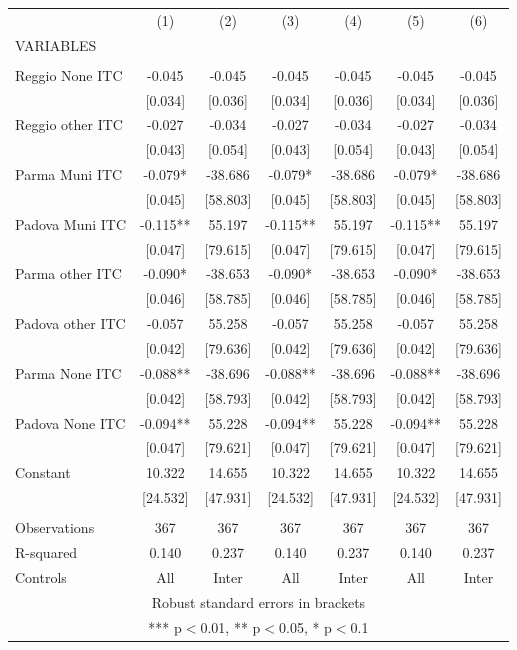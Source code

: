 \begin{tabular}{lcccccc} \hline
 & (1) & (2) & (3) & (4) & (5) & (6) \\
VARIABLES &  &  &  &  &  &  \\ \hline
 &  &  &  &  &  &  \\
Reggio None ITC & -0.045 & -0.045 & -0.045 & -0.045 & -0.045 & -0.045 \\
 & [0.034] & [0.036] & [0.034] & [0.036] & [0.034] & [0.036] \\
Reggio other ITC & -0.027 & -0.034 & -0.027 & -0.034 & -0.027 & -0.034 \\
 & [0.043] & [0.054] & [0.043] & [0.054] & [0.043] & [0.054] \\
Parma Muni ITC & -0.079* & -38.686 & -0.079* & -38.686 & -0.079* & -38.686 \\
 & [0.045] & [58.803] & [0.045] & [58.803] & [0.045] & [58.803] \\
Padova Muni ITC & -0.115** & 55.197 & -0.115** & 55.197 & -0.115** & 55.197 \\
 & [0.047] & [79.615] & [0.047] & [79.615] & [0.047] & [79.615] \\
Parma other ITC & -0.090* & -38.653 & -0.090* & -38.653 & -0.090* & -38.653 \\
 & [0.046] & [58.785] & [0.046] & [58.785] & [0.046] & [58.785] \\
Padova other ITC & -0.057 & 55.258 & -0.057 & 55.258 & -0.057 & 55.258 \\
 & [0.042] & [79.636] & [0.042] & [79.636] & [0.042] & [79.636] \\
Parma None ITC & -0.088** & -38.696 & -0.088** & -38.696 & -0.088** & -38.696 \\
 & [0.042] & [58.793] & [0.042] & [58.793] & [0.042] & [58.793] \\
Padova None ITC & -0.094** & 55.228 & -0.094** & 55.228 & -0.094** & 55.228 \\
 & [0.047] & [79.621] & [0.047] & [79.621] & [0.047] & [79.621] \\
Constant & 10.322 & 14.655 & 10.322 & 14.655 & 10.322 & 14.655 \\
 & [24.532] & [47.931] & [24.532] & [47.931] & [24.532] & [47.931] \\
 &  &  &  &  &  &  \\
Observations & 367 & 367 & 367 & 367 & 367 & 367 \\
R-squared & 0.140 & 0.237 & 0.140 & 0.237 & 0.140 & 0.237 \\
 Controls & All & Inter & All & Inter & All & Inter \\ \hline
\multicolumn{7}{c}{ Robust standard errors in brackets} \\
\multicolumn{7}{c}{ *** p$<$0.01, ** p$<$0.05, * p$<$0.1} \\
\end{tabular}
